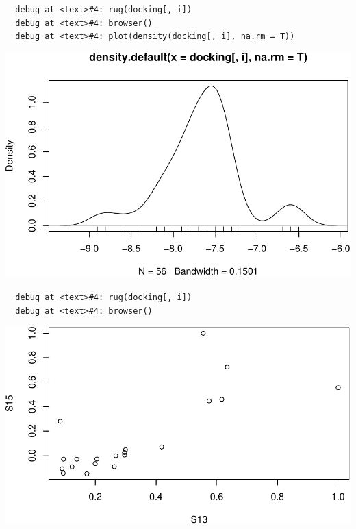 \documentclass[12pt,twoside]{reedthesis}
\begin{document}
  \begin{verbatim}
  debug at <text>#4: rug(docking[, i])
  debug at <text>#4: browser()
  debug at <text>#4: plot(density(docking[, i], na.rm = T))
  \end{verbatim}
  
  \begin{center}\includegraphics{tesis_files/figure-latex/johan-20} \end{center}
  
  \begin{verbatim}
  debug at <text>#4: rug(docking[, i])
  debug at <text>#4: browser()
  \end{verbatim}
  
  \begin{Shaded}
  \begin{Highlighting}[]
  \NormalTok{(}\NormalTok{(docking[-}\NormalTok{(}\NormalTok{,}\NormalTok{,}\NormalTok{,}\NormalTok{,}\NormalTok{),-}\NormalTok{]))}
  \end{Highlighting}
  \end{Shaded}
  
  \begin{center}\includegraphics{tesis_files/figure-latex/johan-21} \end{center}
  
\end{document}
